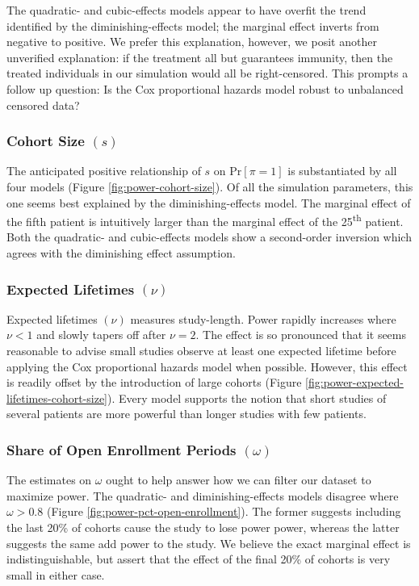
The quadratic- and cubic-effects models appear to have overfit the trend identified by the diminishing-effects model; the marginal effect inverts from negative to positive. We prefer this explanation, however, we posit another unverified explanation: if the treatment all but guarantees immunity, then the treated individuals in our simulation would all be right-censored. This prompts a follow up question: Is the Cox proportional hazards model robust to unbalanced censored data? 

\subsubsection{Cohort Size $(s)$}

The anticipated positive relationship of $s$ on $\text{Pr}[\pi = 1]$ is substantiated by all four models (Figure \ref{fig:power-cohort-size}). Of all the simulation parameters, this one seems best explained by the diminishing-effects model. The marginal effect of the fifth patient is intuitively larger than the marginal effect of the 25\textsuperscript{th} patient. Both the quadratic- and cubic-effects models show a second-order inversion which agrees with the diminishing effect assumption. 

\subsubsection{Expected Lifetimes $(\nu)$}

Expected lifetimes $(\nu)$ measures study-length. Power rapidly increases where $\nu < 1$ and slowly tapers off after $\nu = 2$. The effect is so pronounced that it seems reasonable to advise small studies observe at least one expected lifetime before applying the Cox proportional hazards model when possible. However, this effect is readily offset by the introduction of large cohorts (Figure \ref{fig:power-expected-lifetimes-cohort-size}). Every model supports the notion that short studies of several patients are more powerful than longer studies with few patients. 

\subsubsection{Share of Open Enrollment Periods $(\omega)$}

The estimates on $\omega$ ought to help answer how we can filter our dataset to maximize power. The quadratic- and diminishing-effects models disagree where $\omega > 0.8$ (Figure \ref{fig:power-pct-open-enrollment}). The former suggests including the last 20\% of cohorts cause the study to lose power power, whereas the latter suggests the same add power to the study. We believe the exact marginal effect is indistinguishable, but assert that the effect of the final 20\% of cohorts is very small in either case\footnotemark.




